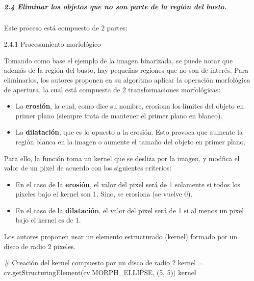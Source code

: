 \documentclass[
]{article}
\newenvironment{Shaded}{\begin{snugshade}}{\end{snugshade}}
\newcommand{\CommentTok}[1]{\textcolor[rgb]{0.54,0.53,0.53}{#1}}
\newcommand{\DecValTok}[1]{\textcolor[rgb]{0.69,0.50,0.00}{#1}}
\newcommand{\NormalTok}[1]{\textcolor[rgb]{0.12,0.11,0.11}{#1}}
\newcommand{\OperatorTok}[1]{\textcolor[rgb]{0.12,0.11,0.11}{#1}}
\providecommand{\tightlist}{%
  \setlength{\itemsep}{0pt}\setlength{\parskip}{0pt}}
\begin{document}
\hypertarget{eliminar-los-objetos-que-no-son-parte-de-la-regiuxf3n-del-busto.}{%
\subparagraph{2.4 Eliminar los objetos que no son parte de la región del
busto.}\label{eliminar-los-objetos-que-no-son-parte-de-la-regiuxf3n-del-busto.}}

Este proceso está compuesto de 2 partes:

2.4.1 Procesamiento morfológico

Tomando como base el ejemplo de la imagen binarizada, se puede notar que
además de la región del busto, hay pequeñas regiones que no son de
interés. Para eliminarlos, los autores proponen en su algoritmo aplicar
la operación morfológica de apertura, la cual está compuesta de 2
transformaciones morfológicas:

\begin{itemize}
\tightlist
\item
  La \textbf{erosión}, la cual, como dice su nombre, erosiona los
  límites del objeto en primer plano (siempre trata de mantener el
  primer plano en blanco).
\item
  La \textbf{dilatación}, que es lo opuesto a la erosión. Esto provoca
  que aumente la región blanca en la imagen o aumente el tamaño del
  objeto en primer plano.
\end{itemize}

Para ello, la función toma un kernel que se desliza por la imagen, y
modfica el valor de un pixel de acuerdo con los siguientes criterios:

\begin{itemize}
\tightlist
\item
  En el caso de la \textbf{erosión}, el valor del pixel será de 1
  solamente si todos los pixeles bajo el kernel son 1. Sino, se erosiona
  (se vuelve 0).
\item
  En el caso de la \textbf{dilatación}, el valor del pixel será de 1 si
  al menos un pixel bajo el kernel es de 1.
\end{itemize}

Los autores proponen usar un elemento estructurado (kernel) formado por
un disco de radio 2 pixeles.

\begin{Shaded}
\begin{Highlighting}[]
\CommentTok{\# Creación del kernel compuesto por un disco de radio 2}
\NormalTok{kernel }\OperatorTok{=}\NormalTok{ cv.getStructuringElement(cv.MORPH\_ELLIPSE, (}\DecValTok{5}\NormalTok{, }\DecValTok{5}\NormalTok{))}
\NormalTok{kernel}
\end{Highlighting}
\end{Shaded}
\end{document}
